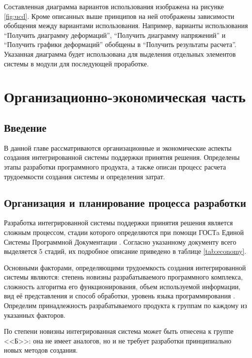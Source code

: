 \documentclass[14pt,oneside,final]{extreport}
\begin{document}
	Составленная диаграмма вариантов использования изображена на рисунке \ref{fig:ucd}. Кроме описанных выше принципов на ней отображены зависимости обобщения между вариантами использования. Например, варианты использования ``Получить диаграмму деформаций'', ``Получить диаграмму напряжений'' и ``Получить графики деформаций'' обобщены в ``Получить результаты расчета''.  Указанная диаграмма будет использована для выделения отдельных элементов системы в модули для последующей проработке. 
	
	\chapter{Организационно-экономическая часть}
	\section{Введение}
	В данной главе рассматриваются организационные и экономические аспекты создания интегрированной системы поддержки принятия решения. Определены этапы разработки программного продукта, а также описан процесс расчета трудоемкости  создания системы и определения затрат. 


	\section{Организация и планирование процесса разработки}
	Разработка интегрированной системы поддержки принятия решения является сложным процессом, стадии которого определяются при помощи ГОСТa Единой Системы Программной Документации \cite{gost:19102}. Согласно указанному документу всего выделяется 5 стадий, их подробное описание приведено в таблице \ref{tab:economy}.
	
	Основными факторами, определяющими трудоемкость создания интегрированной системы являются: степень новизны разрабатываемого программного комплекса, сложность алгоритма его функционирования, объем используемой информации, вид её представления и способ обработки, уровень языка программирования \cite{metoda:Economy}. Определим принадлежность разрабатываемого продукта к группам по каждому из указанных факторов. 
	
	По степени новизны интегрированная система может быть отнесена к группе <<Б>>: она не имеет аналогов, но и не требует разработки принципиально новых методов создания. 
	
\end{document}
